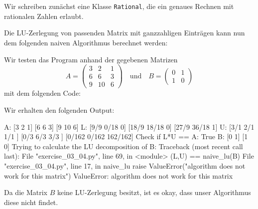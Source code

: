\section{}
\label{section: LU decomposition}

Wir schreiben zunächst eine Klasse \texttt{Rational}, die ein genaues Rechnen mit rationalen Zahlen erlaubt.



Die LU-Zerlegung von passenden Matrix mit ganzzahligen Einträgen kann nun dem folgenden naiven Algorithmus berechnet werden:



Wir testen das Program anhand der gegebenen Matrizen
\[
    A
    = \begin{pmatrix}
        3 &  2 & 1  \\
        6 &  6 & 3  \\
        9 & 10 & 6
      \end{pmatrix}
    \quad\text{und}\quad
    B
    = \begin{pmatrix}
        0 & 1 \\
        1 & 0
      \end{pmatrix}
\]
mit dem folgenden Code:



Wir erhalten den folgenden Output:

\begin{consoleoutput}
A:
[3 2  1]
[6 6  3]
[9 10 6]
L:
[9/9  0/18  0]
[18/9 18/18 0]
[27/9 36/18 1]
U:
[3/1   2/1   1/1    ]
[0/3   6/3   3/3    ]
[0/162 0/162 162/162]
Check if L*U == A:
True
B:
[0 1]
[1 0]
Trying to calculate the LU decomposition of B:
Traceback (most recent call last):
  File "exercise_03_04.py", line 69, in <module>
    (L,U) == naive_lu(B)
  File "exercise_03_04.py", line 17, in naive_lu
    raise ValueError("algorithm does not work for this matrix")
ValueError: algorithm does not work for this matrix
\end{consoleoutput}

Da die Matrix $B$ keine LU-Zerlegung besitzt, ist es okay, dass unser Algorithmus diese nicht findet.
